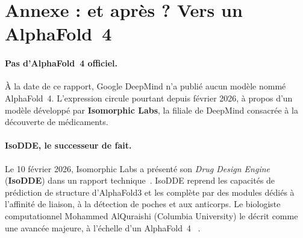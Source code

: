 \section{Annexe : et après ? Vers un \og AlphaFold~4 \fg{}}
\label{annexe:af4}

\paragraph{Pas d'AlphaFold~4 officiel.} À la date de ce rapport, Google DeepMind n'a publié aucun modèle nommé AlphaFold~4. L'expression circule pourtant depuis février 2026, à propos d'un modèle développé par \textbf{Isomorphic Labs}, la filiale de DeepMind consacrée à la découverte de médicaments.

\paragraph{IsoDDE, le successeur de fait.} Le 10 février 2026, Isomorphic Labs a présenté son \emph{Drug Design Engine} (\textbf{IsoDDE}) dans un rapport technique~\cite{isodde2026}. IsoDDE reprend les capacités de prédiction de structure d'AlphaFold3 et les complète par des modules dédiés à l'affinité de liaison, à la détection de poches et aux anticorps. Le biologiste computationnel Mohammed AlQuraishi (Columbia University) le décrit comme \og une avancée majeure, à l'échelle d'un AlphaFold~4 \fg{}~\cite{callaway2026}.


